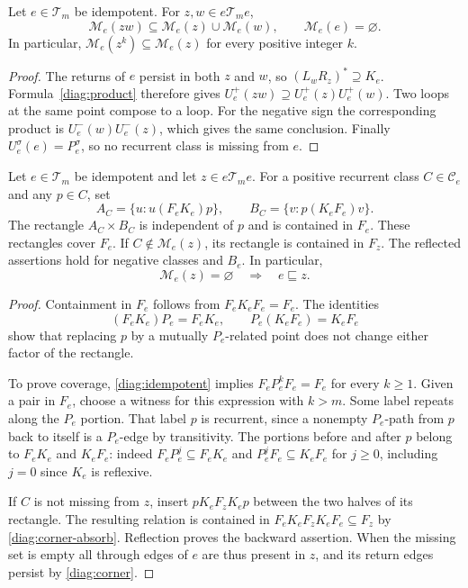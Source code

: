 \begin{lemma}\label{diag:missing}
Let $e\in\mathcal T_m$ be idempotent. For $z,w\in e\mathcal T_me$,
\[
 \mathcal M_e(zw)\subseteq\mathcal M_e(z)\cup\mathcal M_e(w),
 \qquad \mathcal M_e(e)=\varnothing.
\]
In particular, $\mathcal M_e(z^k)\subseteq\mathcal M_e(z)$ for every
positive integer $k$.
\end{lemma}
\begin{proof}
The returns of $e$ persist in both $z$ and $w$, so
$(L_wR_z)^*\supseteq K_e$. Formula~\eqref{diag:product} therefore gives
$U_e^+(zw)\supseteq U_e^+(z)U_e^+(w)$. Two loops at the same point
compose to a loop. For the negative sign the corresponding product is
$U_e^-(w)U_e^-(z)$, which gives the same conclusion. Finally
$U_e^\sigma(e)=P_e^\sigma$, so no recurrent class is missing from $e$.
\end{proof}

\begin{lemma}\label{diag:rectangles}
Let $e\in\mathcal T_m$ be idempotent and let $z\in e\mathcal T_me$.
For a positive recurrent class $C\in\mathcal C_e$ and any $p\in C$, set
\[
 A_C=\{u:u(F_eK_e)p\},\qquad
 B_C=\{v:p(K_eF_e)v\}.
\]
The rectangle $A_C\times B_C$ is independent of $p$ and is contained
in $F_e$. These rectangles cover $F_e$. If
$C\notin\mathcal M_e(z)$, its rectangle is contained in $F_z$.
The reflected assertions hold for negative classes and $B_e$.
In particular,
\begin{equation}\label{diag:detect}
 \mathcal M_e(z)=\varnothing\quad\Longrightarrow\quad e\sqsubseteq z.
\end{equation}
\end{lemma}
\begin{proof}
Containment in $F_e$ follows from $F_eK_eF_e=F_e$.
The identities
\[
 (F_eK_e)P_e=F_eK_e,\qquad P_e(K_eF_e)=K_eF_e
\]
show that replacing $p$ by a mutually $P_e$-related point does not
change either factor of the rectangle.

To prove coverage, \eqref{diag:idempotent} implies
$F_eP_e^kF_e=F_e$ for every $k\ge1$. Given a pair in $F_e$, choose a
witness for this expression with $k>m$. Some label repeats along the
$P_e$ portion. That label $p$ is recurrent, since a nonempty $P_e$-path
from $p$ back to itself is a $P_e$-edge by transitivity. The portions
before and after $p$ belong to $F_eK_e$ and $K_eF_e$: indeed
$F_eP_e^j\subseteq F_eK_e$ and $P_e^jF_e\subseteq K_eF_e$ for
$j\ge0$, including $j=0$ since $K_e$ is reflexive.

If $C$ is not missing from $z$, insert $pK_eF_zK_ep$ between the two
halves of its rectangle. The resulting relation is contained in
$F_eK_eF_zK_eF_e\subseteq F_z$ by
\eqref{diag:corner-absorb}. Reflection proves the backward assertion.
When the missing set is empty all through edges of $e$ are thus present
in $z$, and its return edges persist by \eqref{diag:corner}.
\end{proof}

